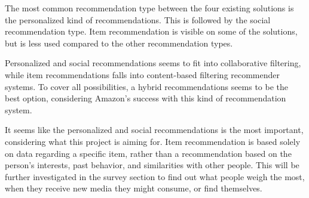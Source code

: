 The most common recommendation type between the four existing solutions is the personalized kind of recommendations. This is followed by the social recommendation type. Item recommendation is visible on some of the solutions, but is less used compared to the other recommendation types.

Personalized and social recommendations seems to fit into collaborative filtering, while item recommendations falls into content-based filtering recommender systems. To cover all possibilities, a hybrid recommendations seems to be the best option, considering Amazon’s success with this kind of recommendation system.

It seems like the personalized and social recommendations is the most important, considering what this project is aiming for. Item recommendation is based solely on data regarding a specific item, rather than a recommendation based on the person's interests, past behavior, and similarities with other people. This will be further investigated in the survey section to find out what people weigh the most, when they receive new media they might consume, or find themselves.